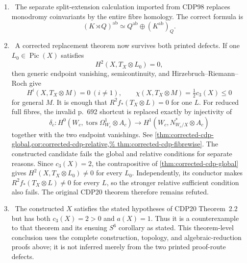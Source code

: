 \begin{enumerate}[leftmargin=1.8em]
\item \Refuted\ The separate split-extension calculation imported from
CDP98 replaces monodromy coinvariants by the entire fibre homology.  The
correct formula is
\[
 (K\rtimes Q)^{\mathrm{ab}}
 \simeq Q^{\mathrm{ab}}\oplus(K^{\mathrm{ab}})_Q.
\]

\item \Verified\ A corrected replacement theorem now survives both printed
defects.  If one \(L_0\in\operatorname{Pic}(X)\) satisfies
\[
 H^2(X,T_X\otimes L_0)=0,
\]
then generic endpoint vanishing, semicontinuity, and
Hirzebruch--Riemann--Roch give
\[
 H^i(X,T_X\otimes M)=0\ (i\ne1),\qquad
 \chi(X,T_X\otimes M)=\tfrac12c_3(X)\le0
\]
for general \(M\).  It is enough that
\(R^2f_*(T_X\otimes L)=0\) for one \(L\).  For reduced full fibres, the
invalid p.~692 shortcut is replaced exactly by injectivity of
\[
 \delta_c:H^0(W_c,\operatorname{tors}\Omega^1_{W_c}\otimes A_c)
 \longrightarrow H^1(W_c,N^*_{W_c/X}\otimes A_c)
\]
together with the two endpoint vanishings.  See
\cref{thm:corrected-cdp-global,cor:corrected-cdp-relative,%
 thm:corrected-cdp-fibrewise}.  The constructed candidate fails the global and
 relative conditions for separate reasons.  Since \(c_3(X)=2\), the
 contrapositive of \cref{thm:corrected-cdp-global} gives
 \(H^2(X,T_X\otimes L_0)\ne0\) for every \(L_0\).  Independently, its
 conductor makes \(R^2f_*(T_X\otimes L)\ne0\) for every \(L\), so the stronger
 relative sufficient condition also fails.  The original CDP20 theorem
 therefore remains refuted.

\item \Verified\ The constructed \(X\) satisfies the stated hypotheses of
CDP20 Theorem~2.2 but has both \(c_3(X)=2>0\) and \(a(X)=1\).  Thus it is a
counterexample to that theorem and its ensuing \(S^6\) corollary as stated.
This theorem-level conclusion uses the complete construction, topology, and
algebraic-reduction proofs above; it is not inferred merely from the two
printed proof-route defects.


\end{enumerate}
